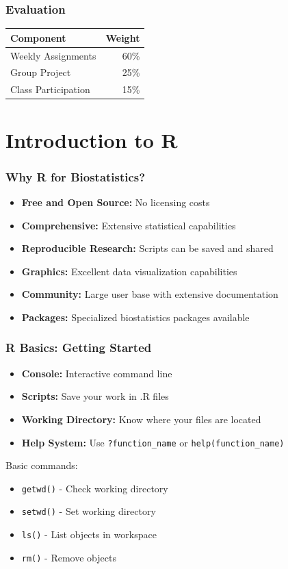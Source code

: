 \documentclass{beamer}
\begin{document}
\begin{frame}
\frametitle{Evaluation}
\begin{center}
\begin{tabular}{lr}
\toprule
\textbf{Component} & \textbf{Weight} \\
\midrule
Weekly Assignments & 60\% \\
Group Project & 25\% \\
Class Participation & 15\% \\
\bottomrule
\end{tabular}
\end{center}
\end{frame}

\section{Introduction to R}

\begin{frame}
\frametitle{Why R for Biostatistics?}
\begin{itemize}
\item \textbf{Free and Open Source:} No licensing costs
\item \textbf{Comprehensive:} Extensive statistical capabilities
\item \textbf{Reproducible Research:} Scripts can be saved and shared
\item \textbf{Graphics:} Excellent data visualization capabilities
\item \textbf{Community:} Large user base with extensive documentation
\item \textbf{Packages:} Specialized biostatistics packages available
\end{itemize}
\end{frame}

\begin{frame}
\frametitle{R Basics: Getting Started}
\begin{itemize}
\item \textbf{Console:} Interactive command line
\item \textbf{Scripts:} Save your work in .R files
\item \textbf{Working Directory:} Know where your files are located
\item \textbf{Help System:} Use \texttt{?function\_name} or \texttt{help(function\_name)}
\end{itemize}

\vspace{0.5cm}
Basic commands:
\begin{itemize}
\item \texttt{getwd()} - Check working directory
\item \texttt{setwd()} - Set working directory
\item \texttt{ls()} - List objects in workspace
\item \texttt{rm()} - Remove objects
\end{itemize}
\end{frame}
\end{document}
